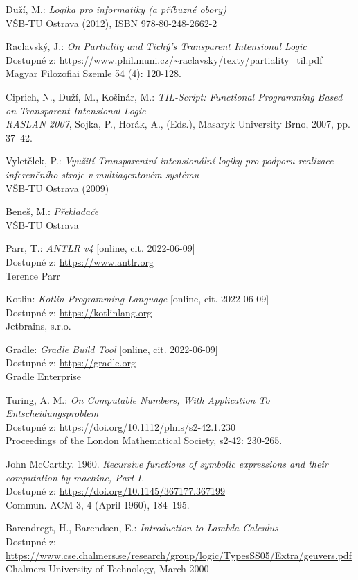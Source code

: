 \documentclass[czech,master]{diploma}
\begin{document}
\begin{thebibliography}{50}
Duží, M.: \textit{Logika pro informatiky (a příbuzné obory)} \\
VŠB-TU Ostrava (2012), ISBN 978-80-248-2662-2

Raclavský, J.: \textit{On Partiality and Tichý's Transparent Intensional Logic} \\
Dostupné z: \url{https://www.phil.muni.cz/~raclavsky/texty/partiality_til.pdf} \\
Magyar Filozofiai Szemle 54 (4): 120-128.

Ciprich, N., Duží, M., Košinár, M.: \textit{TIL-Script: Functional Programming Based on Transparent Intensional Logic} \\
\textit{RASLAN 2007}, Sojka, P., Horák, A., (Eds.), Masaryk University Brno, 2007, pp. 37–42.

Vyletělek, P.: \textit{Využití Transparentní intensionální logiky pro podporu realizace inferenčního stroje v multiagentovém systému} \\
VŠB-TU Ostrava (2009)

Beneš, M.: \textit{Překladače} \\
VŠB-TU Ostrava

Parr, T.: \textit{ANTLR v4} [online, cit. 2022-06-09] \\
Dostupné z: \url{https://www.antlr.org} \\
Terence Parr

Kotlin: \textit{Kotlin Programming Language} [online, cit. 2022-06-09] \\
Dostupné z: \url{https://kotlinlang.org} \\
Jetbrains, s.r.o.

Gradle: \textit{Gradle Build Tool} [online, cit. 2022-06-09] \\
Dostupné z: \url{https://gradle.org} \\
Gradle Enterprise

Turing, A. M.: \textit{On Computable Numbers, With Application To Entscheidungsproblem} \\
Dostupné z: \url{https://doi.org/10.1112/plms/s2-42.1.230}\\
Proceedings of the London Mathematical Society, s2-42: 230-265.

John McCarthy. 1960. \textit{Recursive functions of symbolic expressions and their computation by machine, Part I.}\\
Dostupné z: \url{https://doi.org/10.1145/367177.367199}\\
Commun. ACM 3, 4 (April 1960), 184–195.

Barendregt, H., Barendsen, E.: \textit{Introduction to Lambda Calculus}\\
Dostupné z: \url{https://www.cse.chalmers.se/research/group/logic/TypesSS05/Extra/geuvers.pdf}\\
Chalmers University of Technology, March 2000

\end{thebibliography}

\appendix

\end{document}
